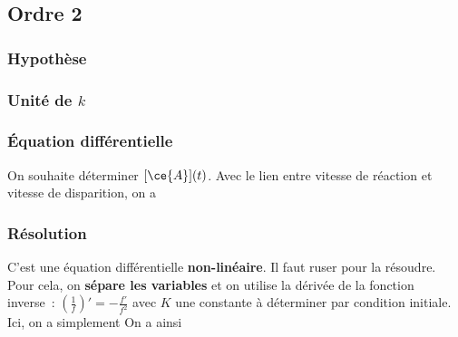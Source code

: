 \documentclass[../../main/main.tex]{subfiles}
\begin{document}
\subsection{Ordre 2}

\subsubsection{Hypothèse}
\smallbreak
{}

\subsubsection{Unité de $k$}


\subsubsection{Équation différentielle}
On souhaite déterminer $[{\ce{A}}](t)$. Avec le lien entre vitesse de réaction et
vitesse de disparition, on a
\psw{
\[
	\dv{[{\ce{A}}]}{t} = -av
	\Lra
	\boxed{\dv{[{\ce{A}}]}{t} = -ka[{\ce{A}}]^2}
\]
}

\subsubsection{Résolution}
C'est une équation différentielle \textbf{non-linéaire}. Il faut ruser pour la
résoudre. Pour cela, on \textbf{sépare les variables} et on utilise la dérivée de la
fonction inverse~: $\left( \frac{1}{f} \right)' = - \frac{f'}{f^2}$
avec $K$ une constante à déterminer par condition initiale. Ici, on a simplement
\psw{
	\[
		\frac{1}{[{\ce{A}}]_0} = K
		\qdonc
		\frac{1}{[{\ce{A}}]} = kat + \frac{1}{[{\ce{A}}]_0}
	\]
}
On a ainsi
\psw{
	\[
		\boxed{[{\ce{A}}](t) = \frac{1}{\frac{1}{[{\ce{A}}]_0} + kat}}
		\Lra
		\boxed{[{\ce{A}}](t) = \frac{[{\ce{A}}]_0}{1 + kat[{\ce{A}}]_0}}
	\]
}
\end{document}
